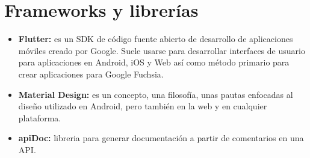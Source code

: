 \section{Frameworks y librerías}
		
		\begin{itemize}
		
			\item \textbf{Flutter:} es un SDK de código fuente abierto de desarrollo de aplicaciones móviles creado por Google. Suele usarse para desarrollar interfaces de usuario para aplicaciones en Android, iOS y Web así como método primario para crear aplicaciones para Google Fuchsia.
			
			\item \textbf{Material Design:} es un concepto, una filosofía, unas pautas enfocadas al diseño utilizado en Android, pero también en la web y en cualquier plataforma.

			\item \textbf{apiDoc:} libreria para generar documentación a partir de comentarios en una API.
			
		\end{itemize}

	